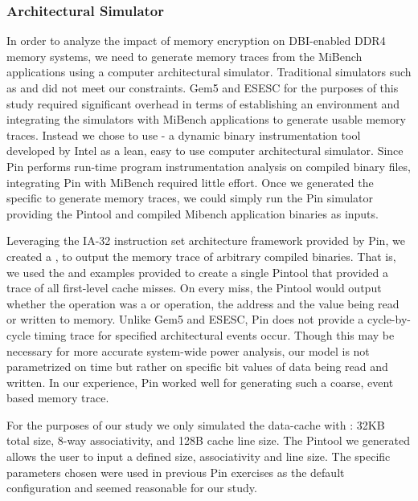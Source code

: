 \subsubsection{Architectural Simulator}
In order to analyze the impact of memory encryption on DBI-enabled DDR4 memory
systems, we need to generate memory traces from the MiBench applications using
a computer architectural simulator. Traditional simulators such as 
\cite{gem5} and  \cite{esesc} did not meet our constraints. Gem5 and
ESESC for the purposes of this study required significant overhead in terms of
establishing an environment and integrating the simulators with MiBench
applications to generate usable memory traces. Instead we chose to use 
\cite{pin} - a dynamic binary instrumentation tool developed by Intel as a
lean, easy to use computer architectural simulator. Since Pin performs run-time
program instrumentation analysis on compiled binary files, integrating Pin with
MiBench required little effort. Once we generated the specific  to
generate memory traces, we could simply run the Pin simulator providing the
Pintool and compiled Mibench application binaries as inputs.

Leveraging the IA-32 instruction set architecture framework provided by Pin, we
created a , to output the memory trace of arbitrary compiled
binaries. That is, we used the  and  examples provided
to create a single Pintool that provided a trace of all first-level cache
misses. On every miss, the Pintool would output whether the operation was a
 or  operation, the address and the value being read or
written to memory. Unlike Gem5 and ESESC, Pin does not provide a cycle-by-cycle
timing trace for specified architectural events occur. Though this may be
necessary for more accurate system-wide power analysis, our model is not
parametrized on time but rather on specific bit values of data being read and
written. In our experience, Pin worked well for generating such a coarse, event
based memory trace.

For the purposes of our study we only simulated the data-cache with : 32KB
total size, 8-way associativity, and 128B cache line size. The Pintool we
generated allows the user to input a defined size, associativity and line size.
The specific parameters chosen were used in previous Pin exercises as the
default configuration and seemed reasonable for our study.

